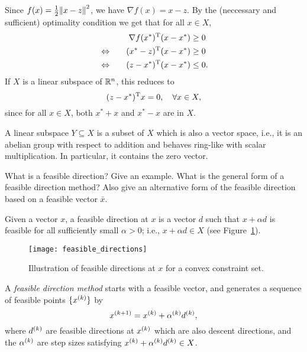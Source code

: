 \documentclass{article}
\begin{document}
Since \(f(x) = \frac{1}{2} \enVert{x - z}^2\), we have \(\nabla f(x) = x - z\).  By the (neccessary
and sufficient) optimality condition we get that for all \(x \in X\),
\begin{alignat*}{2}
  &\quad & \T{\nabla f(x^*)}(x - x^*) &\geq 0 \\
  &\Leftrightarrow\quad & \T{(x^* - z)}(x - x^*) &\geq 0 \\
  &\Leftrightarrow\quad & \T{(z - x^*)}(x - x^*) &\leq 0.
\end{alignat*}
If \(X\) is a linear subspace of \(\RR^n\), this reduces to
\begin{equation*}
  \T{(z - x^*)}x = 0, \quad\forall x \in X,
\end{equation*}
since for all \(x \in X\), both \(x^* + x\) and \(x^* - x\) are in \(X\).

A linear subspace \(Y \subseteq X\) is a subset of \(X\) which is also a vector space, i.e., it is
an abelian group with respect to addition and behaves ring-like with scalar multiplication.  In
particular, it contains the zero vector.

\begin{question}
  What is a feasible direction? Give an example.  What is the general form of a feasible direction
  method? Also give an alternative form of the feasible direction based on a feasible vector
  \(\bar{x}\).
\end{question}

Given a vector \(x\), a feasible direction at \(x\) is a vector \(d\) such that \(x + \alpha d\) is
feasible for all sufficiently small \(\alpha > 0\); i.e., \(x + \alpha d \in X\) (see
Figure~\ref{fig:feasible-directions}).

\begin{figure}[H]
  \centering
  \texttt{[image: feasible\_directions]}
  \caption{Illustration of feasible directions at \(x\) for a convex constraint
    set.\label{fig:feasible-directions}}
\end{figure}

A \emph{feasible direction method} starts with a feasible vector, and generates a sequence of
feasible points \(\{\kth{x}\}\) by
\begin{equation*}
  \kth[k+1]{x} = \kth{x} + \kth{\alpha}\kth{d},
\end{equation*}
where \(\kth{d}\) are feasible directions at \(\kth{x}\) which are also descent directions, and the
\(\kth{\alpha}\) are step sizes satisfying \(\kth{x} + \kth{\alpha} \kth{d} \in X\).
\end{document}
